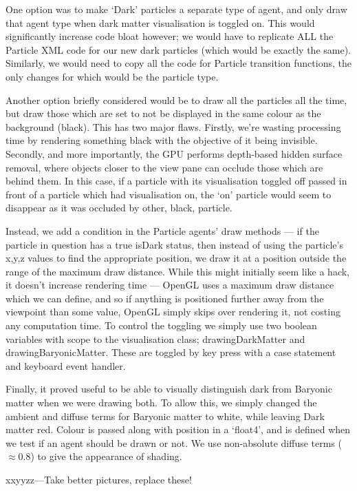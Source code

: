 \documentclass[11pt,a4paper]{article}
\begin{document}
One option was to make `Dark' particles a separate type of agent, and only draw that agent type when dark matter visualisation is toggled on. This would significantly increase code bloat however; we would have to replicate ALL the Particle XML code for our new dark particles (which would be exactly the same). Similarly, we would need to copy all the code for Particle transition functions, the only changes for which would be the particle type. 

Another option briefly considered would be to draw all the particles all the time, but draw those which are set to not be displayed in the same colour as the background (black). This has two major flaws. Firstly, we're wasting processing time by rendering something black with the objective of it being invisible. Secondly, and more importantly, the GPU performs depth-based hidden surface removal, where objects closer to the view pane can occlude those which are behind them. In this case, if a particle with its visualisation toggled off passed in front of a particle which had visualisation on,  the `on' particle would seem to disappear as it was occluded by other, black, particle.

Instead, we add a condition in the Particle agents' draw methods --- if the particle in question has a true isDark status, then instead of using the particle's x,y,z values to find the appropriate position, we draw it at a position outside the range of the maximum draw distance. While this might initially seem like a hack, it doesn't increase rendering time --- OpenGL uses a maximum draw distance which we can define, and so if anything is positioned further away from the viewpoint than some value, OpenGL simply skips over rendering it, not costing any computation time. To control the toggling we simply use two boolean variables with scope to the visualisation class; drawingDarkMatter and drawingBaryonicMatter. These are toggled by key press with a case statement and keyboard event handler.

Finally, it proved useful to be able to visually distinguish dark from Baryonic matter when we were drawing both. To allow this, we simply changed the ambient and diffuse terms for Baryonic matter to white, while leaving Dark matter red. Colour is passed along with position in a `float4', and is defined when we test if an agent should be drawn or not. We use non-absolute diffuse terms ($\approx 0.8$) to give the appearance of shading.

xxyyzz---Take better pictures, replace these!
\end{document}
